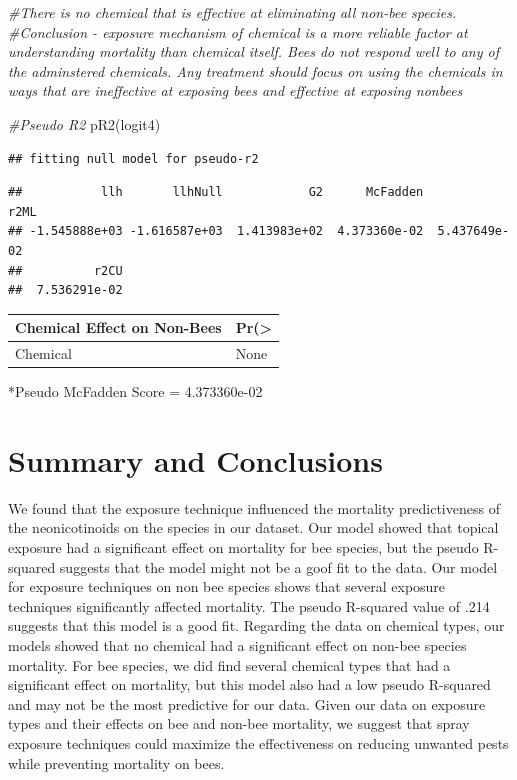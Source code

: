 \documentclass[
  12pt,
]{article}
\newenvironment{Shaded}{\begin{snugshade}}{\end{snugshade}}
\newcommand{\CommentTok}[1]{\textcolor[rgb]{0.56,0.35,0.01}{\textit{#1}}}
\newcommand{\FunctionTok}[1]{\textcolor[rgb]{0.00,0.00,0.00}{#1}}
\newcommand{\NormalTok}[1]{#1}
\begin{document}
\begin{Shaded}
\begin{Highlighting}[]
\CommentTok{\#There is no chemical that is effective at eliminating all non{-}bee species. }
\CommentTok{\#Conclusion {-} exposure mechanism of chemical is a more reliable factor at understanding mortality than chemical itself. Bees do not respond well to any of the adminstered chemicals. Any treatment should focus on using the chemicals in ways that are ineffective at exposing bees and effective at exposing nonbees}

\CommentTok{\#Pseudo R2}
 \FunctionTok{pR2}\NormalTok{(logit4)}
\end{Highlighting}
\end{Shaded}

\begin{verbatim}
## fitting null model for pseudo-r2
\end{verbatim}

\begin{verbatim}
##           llh       llhNull            G2      McFadden          r2ML 
## -1.545888e+03 -1.616587e+03  1.413983e+02  4.373360e-02  5.437649e-02 
##          r2CU 
##  7.536291e-02
\end{verbatim}

\begin{longtable}[]{@{}ll@{}}
\toprule
Chemical Effect on Non-Bees & Pr(\textgreater{} \\
\midrule
\endhead
Chemical & None \\
\bottomrule
\end{longtable}

*Pseudo McFadden Score = 4.373360e-02

\newpage

\hypertarget{summary-and-conclusions}{%
\section{Summary and Conclusions}\label{summary-and-conclusions}}

We found that the exposure technique influenced the mortality
predictiveness of the neonicotinoids on the species in our dataset. Our
model showed that topical exposure had a significant effect on mortality
for bee species, but the pseudo R-squared suggests that the model might
not be a goof fit to the data. Our model for exposure techniques on non
bee species shows that several exposure techniques significantly
affected mortality. The pseudo R-squared value of .214 suggests that
this model is a good fit. Regarding the data on chemical types, our
models showed that no chemical had a significant effect on non-bee
species mortality. For bee species, we did find several chemical types
that had a significant effect on mortality, but this model also had a
low pseudo R-squared and may not be the most predictive for our data.
Given our data on exposure types and their effects on bee and non-bee
mortality, we suggest that spray exposure techniques could maximize the
effectiveness on reducing unwanted pests while preventing mortality on
bees.
\end{document}
